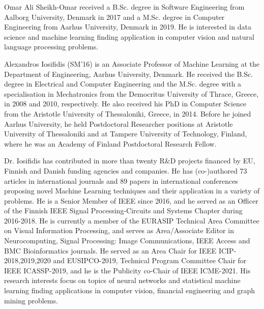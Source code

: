 \documentclass[journal]{IEEEtran}
\begin{document}
\begin{IEEEbiography}{Omar Ali Sheikh-Omar}
received a B.Sc. degree in Software Engineering from Aalborg University, Denmark in 2017 and a M.Sc. degree in Computer Engineering from Aarhus University, Denmark in 2019. He is interested in data science and machine learning finding application in computer vision and natural language processing problems.
\end{IEEEbiography}


\begin{IEEEbiography}{Alexandros Iosifidis} (SM'16) is an Associate Professor of Machine Learning at the Department of Engineering, Aarhus University, Denmark. He received the B.Sc. degree in Electrical and Computer Engineering and the M.Sc. degree with a specialisation in Mechatronics from the Democritus University of Thrace, Greece, in 2008 and 2010, respectively. He also received his PhD in Computer Science from the Aristotle University of Thessaloniki, Greece, in 2014. Before he joined Aarhus University, he held Postdoctoral Researcher positions at Aristotle University of Thessaloniki and at Tampere University of Technology, Finland, where he was an Academy of Finland Postdoctoral Research Fellow. 

Dr. Iosifidis has contributed in more than twenty R\&D projects financed by EU, Finnish and Danish funding agencies and companies. He has (co-)authored 73 articles in international journals and 89 papers in international conferences proposing novel Machine Learning techniques and their application in a variety of problems. He is a Senior Member of IEEE since 2016, and he served as an Officer of the Finnish IEEE Signal Processing-Circuits and Systems Chapter during 2016-2018. He is currently a member of the EURASIP Technical Area Committee on Visual Information Processing, and serves as Area/Associate Editor in Neurocomputing, Signal Processing: Image Communications, IEEE Access and BMC Bioinformatics journals. He served as an Area Chair for IEEE ICIP-2018,2019,2020 and EUSIPCO-2019, Technical Program Committee Chair for IEEE ICASSP-2019, and he is the Publicity co-Chair of IEEE ICME-2021. His research interests focus on topics of neural networks and statistical machine learning finding applications in computer vision, financial engineering and graph mining problems.
\end{IEEEbiography} 
\end{document}
